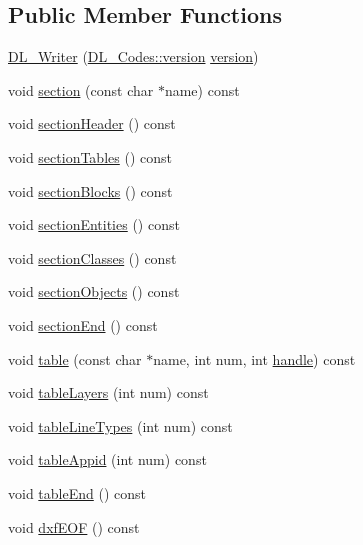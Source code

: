 \subsection*{Public Member Functions}
\begin{DoxyCompactItemize}
\item 
\hyperlink{classDL__Writer_ad068a504f7bbeb205fb21088e4e2165c}{D\-L\-\_\-\-Writer} (\hyperlink{classDL__Codes_a5eba107e2d280c70b52ffab0292fb9dc}{D\-L\-\_\-\-Codes\-::version} \hyperlink{classDL__Writer_af82f15c96f8ddaa4ebfffdb5ea41fb8c}{version})
\item 
void \hyperlink{classDL__Writer_a3a632bc5156c4b670cc8c73ca0a8bff2}{section} (const char $\ast$name) const 
\item 
void \hyperlink{classDL__Writer_a564b261ddc36ae3f4bd30df9d48f2bca}{section\-Header} () const 
\item 
void \hyperlink{classDL__Writer_aad7efefcce3971adcb0859b4d695ac25}{section\-Tables} () const 
\item 
void \hyperlink{classDL__Writer_a796293623a246c67ff1992d1cb8e9ea1}{section\-Blocks} () const 
\item 
void \hyperlink{classDL__Writer_a881fee60d7e5225dd7807b5d301267fb}{section\-Entities} () const 
\item 
void \hyperlink{classDL__Writer_a67e83de1e774c7b25f844659f45355a1}{section\-Classes} () const 
\item 
void \hyperlink{classDL__Writer_af026dc176a1e27798b8532c68a7b7951}{section\-Objects} () const 
\item 
void \hyperlink{classDL__Writer_aea2a24f10850a01a5a47424e7a1a4617}{section\-End} () const 
\item 
void \hyperlink{classDL__Writer_af7484c0222d1596c1e3aace5242652c8}{table} (const char $\ast$name, int num, int \hyperlink{classDL__Writer_a17193a6cbff6d33d64690cd39c91cdcb}{handle}) const 
\item 
void \hyperlink{classDL__Writer_a9d7bbbb1b2c43894ddaf382b892d3060}{table\-Layers} (int num) const 
\item 
void \hyperlink{classDL__Writer_ab0f4dc0281c10c2f0d86bd3ec4ec499e}{table\-Line\-Types} (int num) const 
\item 
void \hyperlink{classDL__Writer_ad36122f06cc582cebf2d26fc135f1095}{table\-Appid} (int num) const 
\item 
void \hyperlink{classDL__Writer_af12e1dbf476e37102738b65d34a5f3ae}{table\-End} () const 
\item 
void \hyperlink{classDL__Writer_a0ab6961a30e8627e1e7dab3ef5fd8f28}{dxf\-E\-O\-F} () const 

\end{DoxyCompactItemize}
